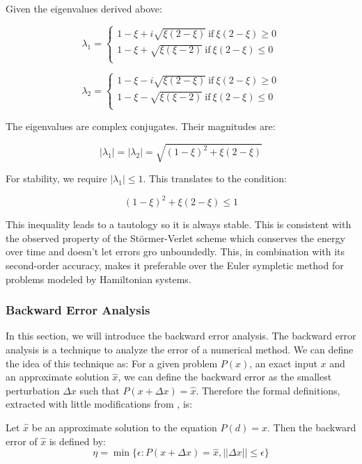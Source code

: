 \documentclass{article}
\begin{document}
Given the eigenvalues derived above:

\[
	\lambda_1 = \begin{cases}
		1 - \xi + i\sqrt{\xi(2-\xi)} \ \text{if} \ \xi(2-\xi) \geq 0 \\
		1 - \xi + \sqrt{\xi(\xi - 2)} \ \text{if} \ \xi(2-\xi) \leq 0 \\
	\end{cases}
\]

\[
	\lambda_2 = \begin{cases}
		1 - \xi - i\sqrt{\xi(2-\xi)} \ \text{if} \ \xi(2-\xi) \geq 0 \\
		1 - \xi - \sqrt{\xi(\xi - 2)} \ \text{if} \ \xi(2-\xi) \leq 0 \\
	\end{cases}
\]

The eigenvalues are complex conjugates. Their magnitudes are:

\[
	|\lambda_1| = |\lambda_2| = \sqrt{(1 - \xi)^2 + \xi(2-\xi)} 
\]

For stability, we require \( |\lambda_1| \leq 1 \). This translates to the condition:

\[
	(1 - \xi)^2 + \xi(2-\xi) \leq 1
\]

This inequality leads to a tautology so it is always stable. This is consistent with the observed property of the Störmer-Verlet scheme which conserves the energy over time and doesn't let errors gro unboundedly. This, in combination with its second-order accuracy, makes it preferable over the Euler sympletic method for problems modeled by Hamiltonian systems.

\subsubsection{Backward Error Analysis}
\label{sec:backward_error_analysis}

In this section, we will introduce the backward error analysis. The backward error analysis is a technique to analyze the error of a numerical method. We can define the idea of this technique as: For a given problem \(P(x)\), an exact input \(x\) and an approximate solution \(\hat{x}\), we can define the backward error as the smallest perturbation \(\Delta x\) such that \(P(x + \Delta x) = \hat{x}\). Therefore the formal definitions, extracted with little modifications from \cite{fraysse2018hdr}, is:

\begin{definition}
	Let \(\hat{x}\) be an approximate solution to the equation \(P(d) = x\). Then the backward error of \(\hat{x}\) is defined by:
	\[
		\eta = \min \{ \epsilon : P(x + \Delta x) = \hat{x}, ||\Delta x|| \leq \epsilon \}
	\]
\end{definition}
\end{document}
